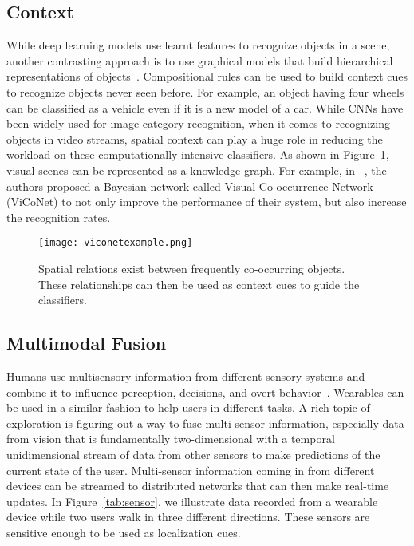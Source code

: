 \subsection{Context}
While deep learning models use learnt features to recognize objects in a scene, another contrasting approach is to use graphical models that build hierarchical 
representations of objects~\cite{hop}. Compositional rules can be used to build context cues to recognize objects never seen before. For example, an object having 
four wheels can be classified as a vehicle even if it is a new model of a car. 
While CNNs have been widely used for image category recognition, when it comes to recognizing objects in video streams, spatial context can play a huge role in 
reducing the workload on these computationally intensive classifiers. As shown in Figure~\ref{fig:viconet}, visual scenes can be represented as a knowledge graph.   
For example, in ~\cite{estimedia2015}, the authors proposed a Bayesian network called Visual Co-occurrence Network (ViCoNet) to not 
only improve the performance of their system, but also increase the recognition rates.

\begin{figure}[!htb]
\centering
\texttt{[image: viconetexample.png]}
\caption{Spatial relations exist between frequently co-occurring objects. These relationships can then be used as context cues to guide the classifiers.}
\label{fig:viconet}
\end{figure} 

\subsection{Multimodal Fusion}
Humans use multisensory information from different sensory systems and combine it to influence 
perception, decisions, and overt behavior~\cite{stein2009neural}. Wearables can be used in a similar fashion to help users in different tasks. 
A rich topic of exploration is figuring out a way to fuse multi-sensor information, especially data from vision that is fundamentally two-dimensional with a temporal 
unidimensional stream of data from other sensors to make predictions of the current state of the user. Multi-sensor information coming in from different devices can be 
streamed to distributed networks that can then make real-time updates. In Figure~\ref{tab:sensor}, we illustrate data recorded from a wearable device while two users
walk in three different directions. These sensors are sensitive enough to be used as localization cues. 

